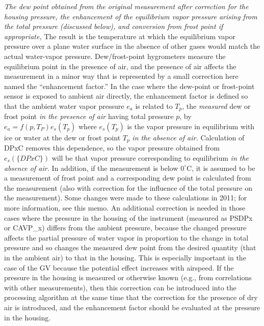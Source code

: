 \documentclass[
]{book}
\begin{document}
\emph{The dew point obtained from the original measurement after correction for the housing pressure, the enhancement of the equilibrium vapor pressure arising from the total pressure (discussed below), and conversion from frost point if appropriate,} The result is the temperature at which the equilibrium vapor pressure over a plane water surface in the absence of other gases would match the actual water-vapor pressure. Dew/frost-point hygrometers measure the equilibrium point in the presence of air, and the presence of air affects the measurement in a minor way that is represented by a small correction here named the ``enhancement factor.'' In the case where the dew-point or frost-point sensor is exposed to ambient air directly, the enhancement factor is defined so that the ambient water vapor pressure \(e_a\) is related to \(T_p\), the \emph{measured} dew or frost point \emph{in the presence of air} having total pressure \(p\), by \(e_a=f(p,T_P)e_s(T_p)\) where \(e_s(T_p)\) is the vapor pressure in equilibrium with ice or water at the dew or frost point \(T_p\) \emph{in the absence of air.} Calculation of DPxC removes this dependence, so the vapor pressure obtained from \(e_s(\{DPxC\})\) will be that vapor pressure corresponding to equilibrium \emph{in the absence of air.} In addition, if the measurement is below \(0^\circ\mathrm{C}\), it is assumed to be a measurement of frost point and a corresponding dew point is calculated from the measurement (also with correction for the influence of the total pressure on the measurement). Some changes were made to these calculations in 2011; for more information, see this memo.
An additional correction is needed in those cases where the pressure in the housing of the instrument (measured as PSDPx or CAVP\_x) differs from the ambient pressure, because the changed pressure affects the partial pressure of water vapor in proportion to the change in total pressure and so changes the measured dew point from the desired quantity (that in the ambient air) to that in the housing. This is especially important in the case of the GV because the potential effect increases with airspeed. If the pressure in the housing is measured or otherwise known (e.g., from correlations with other measurements), then this correction can be introduced into the processing algorithm at the same time that the correction for the presence of dry air is introduced, and the enhancement factor should be evaluated at the pressure in the housing.
\end{document}
